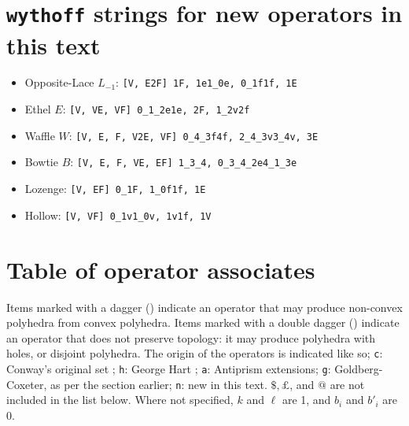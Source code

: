 \documentclass{amsart}[12pt]
\begin{document}



\appendix
\section{\texttt{wythoff} strings for new operators in this text}
\begin{itemize}
  \item Opposite-Lace $L_{-1}$: \texttt{[V, E2F] 1F, 1e1\_0e, 0\_1f1f, 1E}
  \item Ethel $E$: \texttt{[V, VE, VF] 0\_1\_2e1e, 2F, 1\_2v2f}
  \item Waffle $W$: \texttt{[V, E, F, V2E, VF] 0\_4\_3f4f, 2\_4\_3v3\_4v, 3E}
  \item Bowtie $B$: \texttt{[V, E, F, VE, EF] 1\_3\_4, 0\_3\_4\_2e4\_1\_3e}
  \item Lozenge: \texttt{[V, EF] 0\_1F, 1\_0f1f, 1E}
  \item Hollow: \texttt{[V, VF] 0\_1v1\_0v, 1v1f, 1V}
\end{itemize}

\section{Table of operator associates}

Items marked with a dagger (\dag) indicate an operator that may produce non-convex polyhedra from convex polyhedra. Items marked with a double dagger (\ddag) indicate an operator that does not preserve topology: it may produce polyhedra with holes, or disjoint polyhedra. The origin of the operators is indicated like so;
\texttt{c}: Conway's original set \cite{conway};
\texttt{h}: George Hart \cite{hart00}\cite{hart98};
\texttt{a}: Antiprism extensions\cite{antiprism};
\texttt{g}: Goldberg-Coxeter, as per the section earlier;
\texttt{n}: new in this text.
$\$, \pounds$, and $@$ are not included in the list below. Where not specified, $k$ and $\ell$ are 1, and $b_i$ and $b'_i$ are 0.
\end{document}
